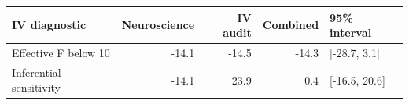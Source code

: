 \begin{tabular}{lrrrl}
\toprule
IV diagnostic & Neuroscience & IV audit & Combined & 95\% interval \\
\midrule
Effective F below 10 & -14.1 & -14.5 & -14.3 & [-28.7, 3.1] \\
Inferential sensitivity & -14.1 & 23.9 & 0.4 & [-16.5, 20.6] \\
\bottomrule
\end{tabular}
